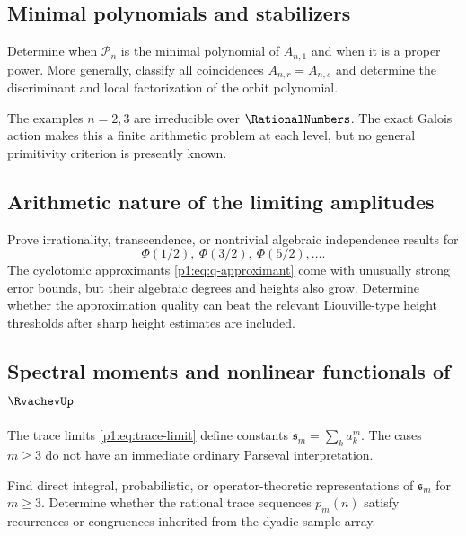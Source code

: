 \documentclass[11pt,oneside]{article}
\theoremstyle{definition}
\theoremstyle{remark}
\newcommand{\PhiU}{\Phi}
\newcommand{\SpectralPowerSum}[1]{\mathfrak{s}_{#1}}
\begin{document}
\subsection{Minimal polynomials and stabilizers}

\begin{problem}\label{p1:prob:minimal-polynomials}
Determine when $\mathcal P_n$ is the minimal polynomial of $A_{n,1}$ and when it
is a proper power.  More generally, classify all coincidences
$A_{n,r}=A_{n,s}$ and determine the discriminant and local factorization of the
orbit polynomial.
\end{problem}

The examples $n=2,3$ are irreducible over $\RationalNumbers$.  The exact Galois action makes
this a finite arithmetic problem at each level, but no general primitivity
criterion is presently known.

\subsection{Arithmetic nature of the limiting amplitudes}

\begin{problem}\label{p1:prob:amplitude-arithmetic}
Prove irrationality, transcendence, or nontrivial algebraic independence results
for
\[
 \PhiU(1/2),\ \PhiU(3/2),\ \PhiU(5/2),\ldots.
\]
The cyclotomic approximants \eqref{p1:eq:q-approximant} come with unusually strong
error bounds, but their algebraic degrees and heights also grow.  Determine
whether the approximation quality can beat the relevant Liouville-type height
thresholds after sharp height estimates are included.
\end{problem}

\subsection{Spectral moments and nonlinear functionals of \texorpdfstring{$\RvachevUp$}{up}}

The trace limits \eqref{p1:eq:trace-limit} define constants
$\SpectralPowerSum{m}=\sum_ka_k^m$.  The cases $m\ge3$ do not have an immediate
ordinary Parseval interpretation.

\begin{problem}\label{p1:prob:nonlinear-traces}
Find direct integral, probabilistic, or operator-theoretic representations of
$\SpectralPowerSum{m}$ for $m\ge3$.  Determine whether the rational trace sequences
$p_m(n)$ satisfy recurrences or congruences inherited from the dyadic sample
array.
\end{problem}
\end{document}
